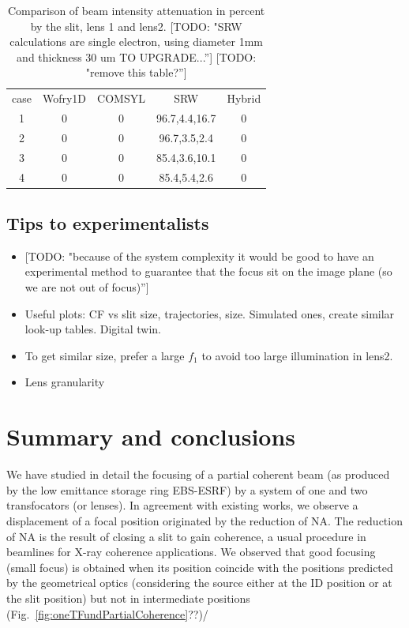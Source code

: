 \documentclass{iucr}              %
\newcommand{\todo}[1]{{\color{red}[TODO: "#1'']}}
\begin{document}
\begin{table}[]
    \label{table:absorption}
    \caption{Comparison of beam intensity attenuation in percent by the slit, lens 1 and lens2.
    \todo{SRW calculations are single electron, using diameter 1mm and thickness 30 um TO UPGRADE...}
    \todo{remove this table?}
    }
    \centering
    \begin{tabular}{c|c|c|c|c}
case  & Wofry1D & COMSYL  & SRW& Hybrid \\
1     & 0       & 0       & 96.7,4.4,16.7   & 0 \\
2     & 0       & 0       & 96.7,3.5,2.4   & 0 \\
3     & 0       & 0       & 85.4,3.6,10.1   & 0 \\
4     & 0       & 0       & 85.4,5.4,2.6    & 0 
    \end{tabular}
\end{table}


\subsection{Tips to experimentalists}

\begin{itemize}
    \item \todo{because of the system complexity it would be good to have an experimental method to guarantee that the focus sit on the image plane (so we are not out of focus)}
    \item Useful plots: CF vs slit size, trajectories, size. Simulated ones, create similar look-up tables. Digital twin. 
    \item To get similar size, prefer a large $f_1$ to avoid too large illumination in lens2.
    \item Lens granularity
\end{itemize}



\section{Summary and conclusions}
\label{sec:summary}

We have studied in detail the focusing of a partial coherent beam (as produced by the low emittance storage ring EBS-ESRF) by a system of one and two transfocators (or lenses). In agreement with existing works, we observe a displacement of a focal position originated by the reduction of NA. The reduction of NA is the result of closing a slit to gain coherence, a usual procedure in beamlines for X-ray coherence applications. We observed that good focusing (small focus) is obtained when its position coincide with the positions predicted by the geometrical optics (considering the source either at the ID position or at the slit position) but not in intermediate positions (Fig.~\ref{fig:oneTFundPartialCoherence}??)/
\end{document}
